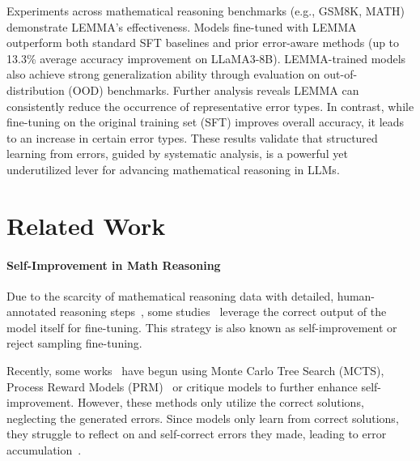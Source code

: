 \documentclass[11pt]{article}
\begin{document}
Experiments across mathematical reasoning benchmarks (e.g., GSM8K, MATH) demonstrate LEMMA's effectiveness. Models fine-tuned with LEMMA outperform both standard SFT baselines and prior error-aware methods (up to 13.3\% average accuracy improvement on LLaMA3-8B). LEMMA-trained models also achieve strong generalization ability through evaluation on out-of-distribution (OOD) benchmarks. 
Further analysis reveals LEMMA can consistently reduce the occurrence of representative error types. In contrast, while fine-tuning on the original training set (SFT) improves overall accuracy, it leads to an increase in certain error types.
These results validate that structured learning from errors, guided by systematic analysis, is a powerful yet underutilized lever for advancing mathematical reasoning in LLMs.



\section{Related Work}
\label{sec:related_work}

\paragraph{Self-Improvement in Math Reasoning}

Due to the scarcity of mathematical reasoning data with detailed, human-annotated reasoning steps~\cite{song2023comprehensive,luo2023wizardmath}, some studies~\cite{zelikman2022star,yuan2023scaling,pan2024llmlingua,singhbeyond,tong2024optimizing} leverage the correct output of the model itself for fine-tuning. This strategy is also known as self-improvement or reject sampling fine-tuning.
 
Recently, some works~\cite{qi2024mutual,xitraining,xu-etal-2024-chatglm,xi2024enhancing,qin2024o1,pan2025memory,guan2025rstar} have begun using Monte Carlo Tree Search (MCTS), Process Reward Models (PRM)~\cite{lightmanlet} or critique models to further enhance self-improvement. However, these methods only utilize the correct solutions, neglecting the generated errors. 
Since models only learn from correct solutions, they struggle to reflect on and self-correct errors they made, leading to error accumulation~\cite{zhang-etal-2024-small,han2024small,yan2024s}. 
\end{document}
